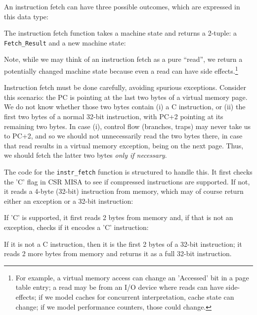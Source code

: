 \documentclass[11pt]{article}
\begin{document}
\label{sec_instr_fetch}

An instruction fetch can have three possible outcomes, which are
expressed in this data type:



The instruction fetch function takes a machine state and returns a
2-tuple: a \verb|Fetch_Result| and a new machine state:



Note, while we may think of an instruction fetch as a pure ``read'',
we return a potentially changed machine state because even a read can
have side effects.\footnote{For example, a virtual memory access can
change an 'Accessed' bit in a page table entry; a read may be from an
I/O device where reads can have side-effects; if we model caches for
concurrent interpretation, cache state can change; if we model
performance counters, those could change.}

Instruction fetch must be done carefully, avoiding spurious
exceptions.  Consider this scenario: the PC is pointing at the last
two bytes of a virtual memory page.  We do not know whether those two
bytes contain (i) a C instruction, or (ii) the first two bytes of a
normal 32-bit instruction, with PC+2 pointing at its remaining two
bytes.  In case (i), control flow (branches, traps) may never take us
to PC+2, and so we should not unnecessarily read the two bytes there,
in case that read results in a virtual memory exception, being on the
next page.  Thus, we should fetch the latter two bytes \emph{only if
necessary}.

The code for the \verb|instr_fetch| function is structured to handle
this.  It first checks the 'C' flag in CSR MISA to see if compressed
instructions are supported.  If not, it reads a 4-byte (32-bit)
instruction from memory, which may of course return either an
exception or a 32-bit instruction:



If 'C' is supported, it first reads 2 bytes from memory and, if that
is not an exception, checks if it encodes a 'C' instruction:



If it is not a C instruction, then it is the first 2 bytes of a 32-bit
instruction; it reads 2 more bytes from memory and returns it as a
full 32-bit instruction.

\end{document}
